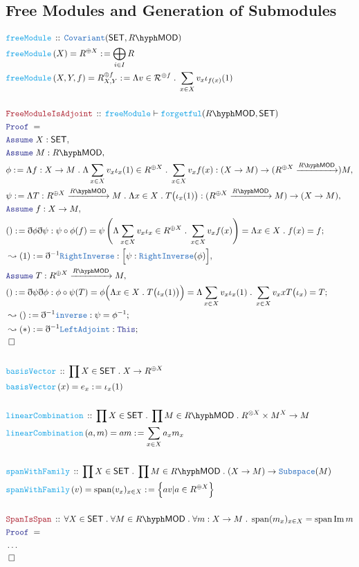 \documentclass[12pt]{scrartcl}
\newcommand{\TYPE}[1]{\textcolor{NavyBlue}{\mathtt{#1}}}
\newcommand{\FUNC}[1]{\textcolor{Cerulean}{\mathtt{#1}}}
\newcommand{\LOGIC}[1]{\textcolor{Blue}{\mathtt{#1}}}
\newcommand{\THM}[1]{\textcolor{Maroon}{\mathtt{#1}}}
\renewcommand{\.}{\; . \;}
\newcommand{\de}{: \kern 0.1pc =}
\newcommand{\Act}[1]{\left(#1\right)}
\newcommand{\Theorem}[2]{& \THM{#1} \, :: \, #2 \\ & \Proof = \\ }
\newcommand{\DeclareFunc}[2]{& \FUNC{#1} \, :: \, #2 \\}
\newcommand{\DefineNamedFunc}[4]{&  \FUNC{#1}\Act{#2} = #3 \de #4 \\}
\newcommand{\Page}[1]{ \begin{align*} #1 \end{align*}   }
\newcommand{ \bd }{ \ByDef }
\newcommand{\NoProof}{ & \ldots \\ \EndProof}
\DeclareMathOperator*{\im}{Im}
\newcommand{\Say}[3]{& #1 \de #2 : #3, \\}
\newcommand{\Conclude}[3]{& #1 \de #2 : #3; \\}
\newcommand{\Derive}[3]{& \leadsto #1 \de #2 : #3, \\}
\newcommand{\DeriveConclude}[3]{& \leadsto #1 \de #2 : #3 ; \\}
\newcommand{\Assume}[2]{& \LOGIC{Assume} \; #1 : #2, \\}
\newcommand{\QED}{\; \square}
\newcommand{\EndProof}{& \QED \\}
\newcommand{\ByDef}{\eth}
\newcommand{\Proof}{\LOGIC{Proof} \; }
\newcommand{\Arrow}[1]{\xrightarrow{#1}}
\newcommand{\Cov}{\TYPE{Covariant}}
\newcommand{\R}{\mathcal{R}}
\newcommand{\SET}{\mathsf{SET}}
\DeclareMathOperator{\Span}{span}
\newcommand{\LMOD}[1]{#1\hyph\mathsf{MOD}}
\begin{document}
\subsection{Free Modules and Generation of Submodules}
\Page{
	\DeclareFunc{freeModule}{\Cov(\SET,\LMOD{R})}
	\DefineNamedFunc{freeModule}{X}{R^{\oplus X}}{ \bigoplus_{i \in I} R  }
	\DefineNamedFunc{freeModule}{X,Y,f}{R^{\oplus f}_{X,Y}}{ \Lambda v \in \R^{\oplus f} \. \sum_{x \in X} v_x \iota_{f(x)}(1)  }
	\\
	\Theorem{FreeModuleIsAdjoint}{ \FUNC{freeModule} \vdash \FUNC{forgetful}(\LMOD{R},\SET)}
	\Assume{X}{\SET}
	\Assume{M}{\LMOD{R}}
	\Say{\phi}{\Lambda f : X \to M \. \Lambda \sum_{x \in X} v_x\iota_x(1) \in R^{\oplus X} \. \sum_{x \in X} v_x f(x)}
	{  (X \to M) \to ( R^{\oplus X} \Arrow{\LMOD{R}}) M }
	\Say{\psi}{\Lambda T : R^{\oplus X} \Arrow{\LMOD{R}} M \. \Lambda x \in X \. T\big(\iota_x(1)\big)}
	{  (R^{\oplus X} \Arrow{\LMOD{R}} M) \to (X \to M)}
	\Assume{f}{X \to M}
	\Conclude{()}{\bd \phi \bd \psi}
	{  
		\psi \circ \phi(f) = \psi\left(\Lambda \sum_{x \in X} v_x\iota_x \in R^{\oplus X} \.
		\sum_{x \in X}  v_x f(x) \right) = \Lambda x \in X \. f(x) = f }
	\Derive{(1)}{\bd^{-1}\TYPE{RightInverse}}{ \Big[\psi : \TYPE{RightInverse}(\phi)\Big]}
	\Assume{T}{ R^{\oplus X} \Arrow{\LMOD{R}} M}
	\Conclude{()}{\bd \psi \bd \phi}
	{
		\phi \circ \psi(T) = \phi\Big( \Lambda x \in X \. T\big(\iota_x(1)\big) \Big) = 
		\Lambda \sum_{x \in X} v_x \iota_x(1) \.  \sum_{x \in X} v_x xT\big( \iota_x) = T 
	}
	\DeriveConclude{()}{\bd^{-1}\TYPE{inverse}}{\psi = \phi^{-1}}
	\DeriveConclude{(*)}{\bd^{-1}\TYPE{LeftAdjoint}}{\LOGIC{This}}
	\EndProof
	\\
	\DeclareFunc{basisVector}{\prod X \in \SET \. X \to R^{\oplus X}}
	\DefineNamedFunc{basisVector}{x}{e_x}{\iota_x(1)}
	\\
	\DeclareFunc{linearCombination}{\prod X \in \SET \. \prod M \in \LMOD{R} \. R^{\otimes X} \times M^X \to M }
	\DefineNamedFunc{linearCombination}{a,m}{am}{\sum_{x \in X} a_xm_x}
	\\
	\DeclareFunc{spanWithFamily}{\prod X \in \SET \. \prod M \in \LMOD{R} \. (X \to M) \to \TYPE{Subspace}(M) }
	\DefineNamedFunc{spanWithFamily}{v}{\Span(v_x)_{x \in X}}{\Big\{ av | a \in R^{\oplus X} \Big\}}
	\\
	\Theorem{SpanIsSpan}{\forall X \in \SET \. \forall M \in \LMOD{R} \. \forall m : X \to M \. \Span(m_x)_{x \in X} = \Span\im m}
	\NoProof
}
\end{document}

